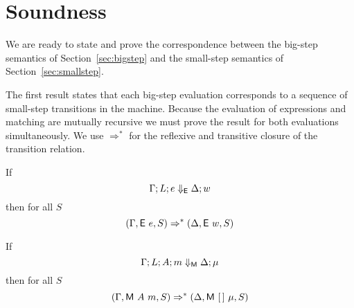 
\section{Soundness} \label{sec:soundness}

We are ready to state and prove the correspondence between the big-step
semantics of Section~\ref{sec:bigstep} and the small-step semantics of
Section~\ref{sec:smallstep}.

The first result states that each big-step evaluation corresponds to a
sequence of small-step transitions in the machine.  Because the
evaluation of expressions and matching are mutually recursive we must
prove the result for both evaluations simultaneously.  We use
$\Rightarrow^{*}$ for the reflexive and transitive closure of the
transition relation.

\begin{theorem}
  If
  \[ \Gamma; L; e \Downarrow_{\textsf{E}} \Delta; w \]
  then for all $S$
  \[ (\Gamma, \textsf{E}~e,  S) \Rightarrow^{*}
    (\Delta, \textsf{E}~w, S)
  \]

  If
  \[ \Gamma; L; A; m \Downarrow_{\textsf{M}} \Delta; \mu
  \]
  then for all $S$
  \[
    (\Gamma, \textsf{M}~A~m, S) \Rightarrow^{*}
    (\Delta, \textsf{M}~[\,]~\mu, S)
  \]
\end{theorem}

